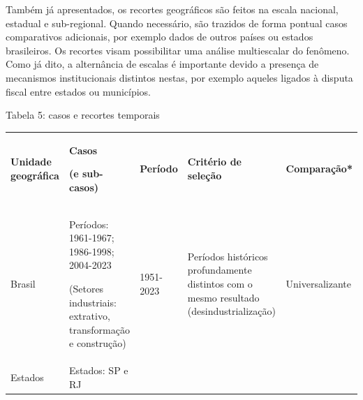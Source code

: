 Também já apresentados, os recortes geográficos são feitos na escala
nacional, estadual e sub-regional. Quando necessário, são trazidos de
forma pontual casos comparativos adicionais, por exemplo dados de outros
países ou estados brasileiros. Os recortes visam possibilitar uma
análise multiescalar do fenômeno. Como já dito, a alternância de escalas
é importante devido a presença de mecanismos institucionais distintos
nestas, por exemplo aqueles ligados à disputa fiscal entre estados ou
municípios.

Tabela 5: casos e recortes temporais

\begin{longtable}[]{@{}
  >{\raggedright\arraybackslash}p{}
  >{\raggedright\arraybackslash}p{}
  >{\raggedright\arraybackslash}p{}
  >{\raggedright\arraybackslash}p{}
  >{\raggedright\arraybackslash}p{}@{}}
\toprule\noalign{}
\begin{minipage}[b]{\linewidth}\raggedright
\textbf{Unidade geográfica}
\end{minipage} & \begin{minipage}[b]{\linewidth}\raggedright
\textbf{Casos}

\textbf{(e sub-casos)}
\end{minipage} & \begin{minipage}[b]{\linewidth}\raggedright
\textbf{Período}
\end{minipage} & \begin{minipage}[b]{\linewidth}\raggedright
\textbf{Critério de seleção}
\end{minipage} & \begin{minipage}[b]{\linewidth}\raggedright
\textbf{Comparação*}
\end{minipage} \\
\begin{minipage}[b]{\linewidth}\raggedright
Brasil
\end{minipage} & \begin{minipage}[b]{\linewidth}\raggedright
Períodos: 1961-1967; 1986-1998; 2004-2023

(Setores industriais: extrativo, transformação e construção)
\end{minipage} & \begin{minipage}[b]{\linewidth}\raggedright
1951-2023
\end{minipage} & \begin{minipage}[b]{\linewidth}\raggedright
Períodos históricos profundamente distintos com o mesmo resultado
(desindustrialização)
\end{minipage} & \begin{minipage}[b]{\linewidth}\raggedright
Universalizante
\end{minipage} \\
\begin{minipage}[b]{\linewidth}\raggedright
Estados
\end{minipage} & \begin{minipage}[b]{\linewidth}\raggedright
Estados: SP e RJ


\end{minipage}
\end{longtable}
